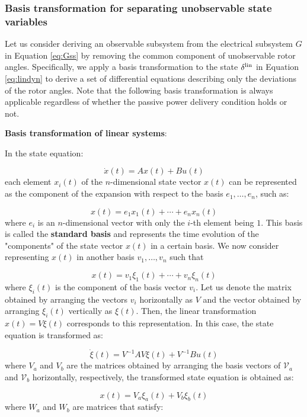 \documentclass[graybox, envcountchap]{svmult}
\begin{document}
\smallskip
\subsubsection{Basis transformation for separating unobservable state variables}

Let us consider deriving an observable subsystem from the electrical subsystem
$G$ in Equation \ref{eq:Gss} by removing the common component of unobservable
rotor angles. Specifically, we apply a basis transformation to the state
$\delta^{\rm lin}$ in Equation \ref{eq:lindyn} to derive a set of differential
equations describing only the deviations of the rotor angles. Note that the
following basis transformation is always applicable regardless of whether the
passive power delivery condition holds or not.

\begin{COLUMN}
\noindent \textbf{Basis transformation of linear systems}:

In the state equation:

\[
  \dot{x}(t)=Ax(t)+Bu(t)
\]
each element $x_i(t)$ of the $n$-dimensional state vector $x(t)$ can be
represented as the component of the expansion with respect to the basis
${e_1,\ldots,e_n}$, such as:

\[
  x(t)
  =
  e_1 x_1(t) + \cdots + e_n x_n(t)
\]
where $e_i$ is an $n$-dimensional vector with only the $i$-th element being $1$.
This basis is called the \textbf{standard basis} and represents the time
evolution of the "components" of the state vector $x(t)$ in a certain basis.  We
now consider representing $x(t)$ in another basis ${v_1,\ldots,v_n}$ such that

\[
  x(t)
  =
  v_1 \xi_1(t) + \cdots + v_n \xi_n(t)
\]
where $\xi_i(t)$ is the component of the basis vector $v_i$. Let us denote the
matrix obtained by arranging the vectors $v_i$ horizontally as $V$ and the
vector obtained by arranging $\xi_i(t)$ vertically as $\xi(t)$. Then, the linear
transformation $x(t)=V\xi(t)$ corresponds to this representation. In this case,
the state equation is transformed as:

\[
  \dot{\xi}(t)=V^{-1}AV \xi(t) + V^{-1} Bu(t)
\]
where $V_{a}$ and $V_{b}$ are the matrices obtained by arranging the basis
vectors of $\mathcal{V}_a$ and $\mathcal{V}_b$ horizontally, respectively, the
transformed state equation is obtained as:

\[
  x(t)=
  V_{a} \xi_{a}(t) +
  V_{b} \xi_{b}(t)
\]
where $W_{a}$ and $W_{b}$ are matrices that satisfy:


\end{COLUMN}
\end{document}

